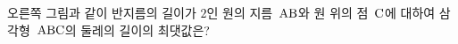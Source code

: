 \noindent\begin{minipage}[t]{0.58\linewidth}\vspace{0pt}\raggedright 오른쪽 그림과 같이 반지름의 길이가 $2$인 원의 지름~$\mathrm{AB}$와 원 위의 점~$\mathrm{C}$에 대하여 삼각형~$\mathrm{ABC}$의 둘레의 길이의 최댓값은?\end{minipage}\hfill\begin{minipage}[t]{0.4\linewidth}\vspace{0pt}\centering \resizebox{\ifdim\width>\linewidth\linewidth\else\width\fi}{!}{}\end{minipage}\par
{}
